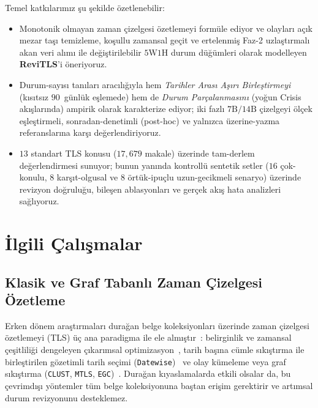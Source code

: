 ﻿\documentclass[journal]{IEEEtran}
\begin{document}
Temel katk{\i}lar{\i}m{\i}z \c{s}u \c{s}ekilde \"{o}zetlenebilir:
\begin{itemize}
    \item Monotonik olmayan zaman \c{c}izelgesi \"{o}zetlemeyi form\"{u}le ediyor ve olaylar{\i} a\c{c}{\i}k mezar ta\c{s}{\i} temizleme, ko\c{s}ullu zamansal ge\c{c}it ve ertelenmi\c{s} Faz-2 uzla\c{s}t{\i}rmal{\i} akan veri al{\i}m{\i} ile de\u{g}i\c{s}tirilebilir $5\text{W}1\text{H}$ durum d\"{u}\u{g}\"{u}mleri olarak modelleyen \textbf{ReviTLS}'i \"{o}neriyoruz.
    \item Durum-say{\i}s{\i} tan{\i}lar{\i} arac{\i}l{\i}\u{g}{\i}yla hem \textit{Tarihler Aras{\i} A\c{s}{\i}r{\i} Birle\c{s}tirmeyi} (k{\i}s{\i}ts{\i}z $90$~g\"{u}nl\"{u}k e\c{s}lemede) hem de \textit{Durum Par\c{c}alanmas{\i}n{\i}} (yo\u{g}un Crisis ak{\i}\c{s}lar{\i}nda) ampirik olarak karakterize ediyor; iki fazl{\i} $7\text{B}/14\text{B}$ \c{c}izelgeyi \"{o}l\c{c}ek e\c{s}le\c{s}tirmeli, sonradan-denetimli (post-hoc) ve yaln{\i}zca \"{u}zerine-yazma referanslar{\i}na kar\c{s}{\i} de\u{g}erlendiriyoruz.
    \item $13$ standart TLS konusu ($17{,}679$ makale) \"{u}zerinde tam-derlem de\u{g}erlendirmesi sunuyor; bunun yan{\i}nda kontroll\"{u} sentetik setler ($16$ \c{c}ok-konulu, $8$ kar\c{s}{\i}t-olgusal ve $8$ \"{o}rt\"{u}k-ipu\c{c}lu uzun-gecikmeli senaryo) \"{u}zerinde revizyon do\u{g}rulu\u{g}u, bile\c{s}en ablasyonlar{\i} ve ger\c{c}ek ak{\i}\c{s} hata analizleri sa\u{g}l{\i}yoruz.
\end{itemize}

\section{\.{I}lgili \c{C}al{\i}\c{s}malar}
\label{sec:related}

\subsection{Klasik ve Graf Tabanl{\i} Zaman \c{C}izelgesi \"{O}zetleme}
Erken d\"{o}nem ara\c{s}t{\i}rmalar{\i} dura\u{g}an belge koleksiyonlar{\i} \"{u}zerinde zaman \c{c}izelgesi \"{o}zetlemeyi (TLS) \"{u}\c{c} ana paradigma ile ele alm{\i}\c{s}t{\i}r~\cite{tran2013leveraging, tran2015timeline, martschat2017improving, ghalandari2020examining}: belirginlik ve zamansal \c{c}e\c{s}itlili\u{g}i dengeleyen \c{c}{\i}kar{\i}msal optimizasyon~\cite{martschat2018temporally}, tarih ba\c{s}{\i}na c\"{u}mle s{\i}k{\i}\c{s}t{\i}rma ile birle\c{s}tirilen g\"{o}zetimli tarih se\c{c}imi (\texttt{Datewise})~\cite{ghalandari2020examining, steen2019abstractive} ve olay k\"{u}meleme veya graf s{\i}k{\i}\c{s}t{\i}rma (\texttt{CLUST}, \texttt{MTLS}, \texttt{EGC})~\cite{ghalandari2020examining, yu2021multi, li2021timeline}. Dura\u{g}an k{\i}yaslamalarda etkili olsalar da, bu \c{c}evrimd{\i}\c{s}{\i} y\"{o}ntemler t\"{u}m belge koleksiyonuna ba\c{s}tan eri\c{s}im gerektirir ve art{\i}msal durum revizyonunu desteklemez.
\end{document}
